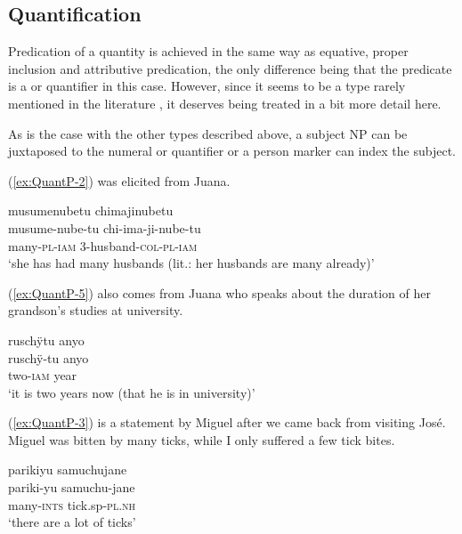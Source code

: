 \subsection{Quantification}\label{sec:Quantification}

Predication of a quantity is achieved in the same way as equative, proper inclusion and attributive predication, the only difference being that the predicate is a  or quantifier in this case. However, since it seems to be a type rarely mentioned in the literature \citep[cf.][61]{Rose2018}, it deserves being treated in a bit more detail here. 

As is the case with the other types described above, a subject NP can be juxtaposed to the numeral or quantifier or a person marker can index the subject.

(\ref{ex:QuantP-2}) was elicited from Juana.

\ea\label{ex:QuantP-2}
\begingl 
\glpreamble musumenubetu chimajinubetu\\
\gla musume-nube-tu chi-ima-ji-nube-tu\\ 
\glb many-\textsc{pl}-\textsc{iam} 3-husband-\textsc{col}-\textsc{pl}-\textsc{iam}\\ 
\glft ‘she has had many husbands (lit.: her husbands are many already)’
\trailingcitation{[jmx-e090727s.076]}
\xe
{}

(\ref{ex:QuantP-5}) also comes from Juana who speaks about the duration of her grandson’s studies at university.

\ea\label{ex:QuantP-5}
\begingl 
\glpreamble ruschÿtu anyo\\
\gla ruschÿ-tu anyo\\ 
\glb two-\textsc{iam} year\\ 
\glft ‘it is two years now (that he is in university)’
\trailingcitation{[jxx-p110923l-1.185]}
\xe

(\ref{ex:QuantP-3}) is a statement by Miguel after we came back from visiting José. Miguel was bitten by many ticks, while I only suffered a few tick bites.

\ea\label{ex:QuantP-3}
\begingl 
\glpreamble parikiyu samuchujane\\
\gla pariki-yu samuchu-jane\\ 
\glb many-\textsc{ints} tick.sp-\textsc{pl.nh}\\ 
\glft ‘there are a lot of ticks’
\trailingcitation{[mrx-c120509l.148]}
\xe

